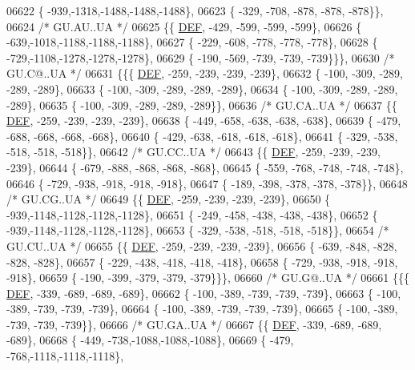 \begin{DoxyCode}
06622 \{ -939,-1318,-1488,-1488,-1488\},
06623 \{ -329, -708, -878, -878, -878\}\},
06624 \textcolor{comment}{/* GU.AU..UA */}
06625 \{\{  \mbox{\hyperlink{1_88_84__epars_8h_a397419fc12b37ed479c8abb9d444d843}{DEF}}, -429, -599, -599, -599\},
06626 \{ -639,-1018,-1188,-1188,-1188\},
06627 \{ -229, -608, -778, -778, -778\},
06628 \{ -729,-1108,-1278,-1278,-1278\},
06629 \{ -190, -569, -739, -739, -739\}\}\},
06630 \textcolor{comment}{/* GU.C@..UA */}
06631 \{\{\{  \mbox{\hyperlink{1_88_84__epars_8h_a397419fc12b37ed479c8abb9d444d843}{DEF}}, -259, -239, -239, -239\},
06632 \{ -100, -309, -289, -289, -289\},
06633 \{ -100, -309, -289, -289, -289\},
06634 \{ -100, -309, -289, -289, -289\},
06635 \{ -100, -309, -289, -289, -289\}\},
06636 \textcolor{comment}{/* GU.CA..UA */}
06637 \{\{  \mbox{\hyperlink{1_88_84__epars_8h_a397419fc12b37ed479c8abb9d444d843}{DEF}}, -259, -239, -239, -239\},
06638 \{ -449, -658, -638, -638, -638\},
06639 \{ -479, -688, -668, -668, -668\},
06640 \{ -429, -638, -618, -618, -618\},
06641 \{ -329, -538, -518, -518, -518\}\},
06642 \textcolor{comment}{/* GU.CC..UA */}
06643 \{\{  \mbox{\hyperlink{1_88_84__epars_8h_a397419fc12b37ed479c8abb9d444d843}{DEF}}, -259, -239, -239, -239\},
06644 \{ -679, -888, -868, -868, -868\},
06645 \{ -559, -768, -748, -748, -748\},
06646 \{ -729, -938, -918, -918, -918\},
06647 \{ -189, -398, -378, -378, -378\}\},
06648 \textcolor{comment}{/* GU.CG..UA */}
06649 \{\{  \mbox{\hyperlink{1_88_84__epars_8h_a397419fc12b37ed479c8abb9d444d843}{DEF}}, -259, -239, -239, -239\},
06650 \{ -939,-1148,-1128,-1128,-1128\},
06651 \{ -249, -458, -438, -438, -438\},
06652 \{ -939,-1148,-1128,-1128,-1128\},
06653 \{ -329, -538, -518, -518, -518\}\},
06654 \textcolor{comment}{/* GU.CU..UA */}
06655 \{\{  \mbox{\hyperlink{1_88_84__epars_8h_a397419fc12b37ed479c8abb9d444d843}{DEF}}, -259, -239, -239, -239\},
06656 \{ -639, -848, -828, -828, -828\},
06657 \{ -229, -438, -418, -418, -418\},
06658 \{ -729, -938, -918, -918, -918\},
06659 \{ -190, -399, -379, -379, -379\}\}\},
06660 \textcolor{comment}{/* GU.G@..UA */}
06661 \{\{\{  \mbox{\hyperlink{1_88_84__epars_8h_a397419fc12b37ed479c8abb9d444d843}{DEF}}, -339, -689, -689, -689\},
06662 \{ -100, -389, -739, -739, -739\},
06663 \{ -100, -389, -739, -739, -739\},
06664 \{ -100, -389, -739, -739, -739\},
06665 \{ -100, -389, -739, -739, -739\}\},
06666 \textcolor{comment}{/* GU.GA..UA */}
06667 \{\{  \mbox{\hyperlink{1_88_84__epars_8h_a397419fc12b37ed479c8abb9d444d843}{DEF}}, -339, -689, -689, -689\},
06668 \{ -449, -738,-1088,-1088,-1088\},
06669 \{ -479, -768,-1118,-1118,-1118\},

\end{DoxyCode}
